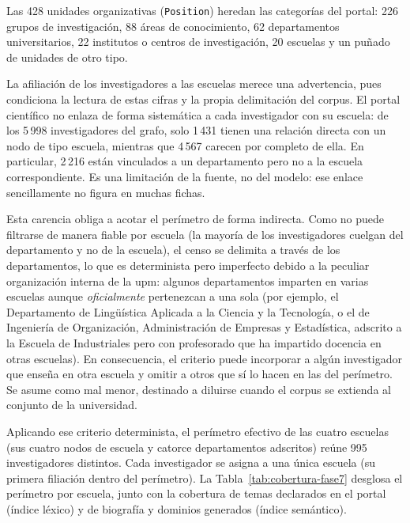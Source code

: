 Las 428 unidades organizativas (\texttt{Position}) heredan las categorías del portal: 226 grupos de investigación, 88 áreas de conocimiento, 62 departamentos universitarios, 22 institutos o centros de investigación, 20 escuelas y un puñado de unidades de otro tipo.

La afiliación de los investigadores a las escuelas merece una advertencia, pues condiciona la lectura de estas cifras y la propia delimitación del corpus.
El portal científico no enlaza de forma sistemática a cada investigador con su escuela: de los 5\,998 investigadores del grafo, solo 1\,431 tienen una relación directa con un nodo de tipo escuela, mientras que 4\,567 carecen por completo de ella. En particular, 2\,216 están vinculados a un departamento pero no a la escuela correspondiente.
Es una limitación de la fuente, no del modelo: ese enlace sencillamente no figura en muchas fichas.

Esta carencia obliga a acotar el perímetro de forma indirecta.
Como no puede filtrarse de manera fiable por escuela (la mayoría de los investigadores cuelgan del departamento y no de la escuela), el censo se delimita a través de los departamentos, lo que es determinista pero imperfecto debido a la peculiar organización interna de la \gls{upm}: algunos departamentos imparten en varias escuelas aunque \emph{oficialmente} pertenezcan a una sola (por ejemplo, el Departamento de Lingüística Aplicada a la Ciencia y la Tecnología, o el de Ingeniería de Organización, Administración de Empresas y Estadística, adscrito a la Escuela de Industriales pero con profesorado que ha impartido docencia en otras escuelas).
En consecuencia, el criterio puede incorporar a algún investigador que enseña en otra escuela y omitir a otros que sí lo hacen en las del perímetro.
Se asume como mal menor, destinado a diluirse cuando el corpus se extienda al conjunto de la universidad.

Aplicando ese criterio determinista, el perímetro efectivo de las cuatro escuelas (sus cuatro nodos de escuela y catorce departamentos adscritos) reúne 995 investigadores distintos.
Cada investigador se asigna a una única escuela (su primera filiación dentro del perímetro).
La Tabla~\ref{tab:cobertura-fase7} desglosa el perímetro por escuela, junto con la cobertura de temas declarados en el portal (índice léxico) y de biografía y dominios generados (índice semántico).

